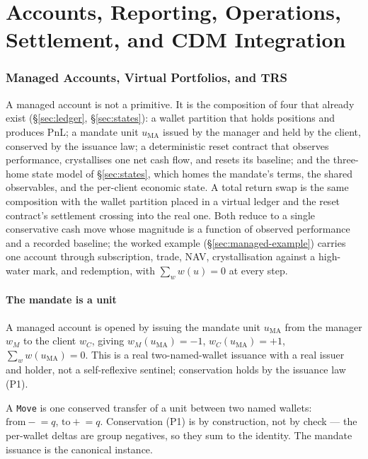 \documentclass[11pt,a4paper]{article}
\begin{document}
\part{Accounts, Reporting, Operations, Settlement, and CDM Integration}
\section{Managed Accounts, Virtual Portfolios, and TRS}
\label{sec:managed}

A managed account is not a primitive. It is the composition of four that already exist
(\S\ref{sec:ledger}, \S\ref{sec:states}): a wallet partition that holds positions and produces
PnL; a mandate unit $u_{\mathrm{MA}}$ issued by the manager and held by the client, conserved by
the issuance law; a deterministic reset contract that observes performance, crystallises one net
cash flow, and resets its baseline; and the three-home state model of \S\ref{sec:states}, which
homes the mandate's terms, the shared observables, and the per-client economic state. A total
return swap is the same composition with the wallet partition placed in a virtual ledger and the
reset contract's settlement crossing into the real one. Both reduce to a single conservative cash
move whose magnitude is a function of observed performance and a recorded baseline; the worked
example (\S\ref{sec:managed-example}) carries one account through subscription, trade, NAV,
crystallisation against a high-water mark, and redemption, with $\sum_w w(u)=0$ at every step.

\subsection{The mandate is a unit}
\label{sec:managed-mandate}

A managed account is opened by issuing the mandate unit $u_{\mathrm{MA}}$ from the manager $w_M$
to the client $w_C$, giving $w_M(u_{\mathrm{MA}})=-1$, $w_C(u_{\mathrm{MA}})=+1$,
$\sum_w w(u_{\mathrm{MA}})=0$. This is a real two-named-wallet issuance with a real issuer and
holder, not a self-reflexive sentinel; conservation holds by the issuance law (P1).

A \texttt{Move} is one conserved transfer of a unit between two named wallets:
$\text{from}\mathbin{-}\!=q$, $\text{to}\mathbin{+}\!=q$. Conservation (P1) is by construction,
not by check --- the per-wallet deltas are group negatives, so they sum to the identity. The
mandate issuance is the canonical instance.
\end{document}
